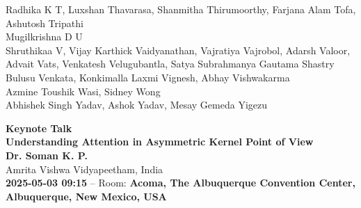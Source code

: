 \documentclass[11pt,oneside]{book}
\begin{document}
\begin{description}
      \newline
          Radhika K T, Luxshan Thavarasa, Shanmitha Thirumoorthy, Farjana Alam Tofa, Ashutosh Tripathi\\
      \newline
          Mugilkrishna D U\\
      \newline
          Shruthikaa V, Vijay Karthick Vaidyanathan, Vajratiya Vajrobol, Adarsh Valoor, Advait Vats, Venkatesh Velugubantla, Satya Subrahmanya Gautama Shastry Bulusu Venkata, Konkimalla Laxmi Vignesh, Abhay Vishwakarma\\
      \newline
          Azmine Toushik Wasi, Sidney Wong\\
      \newline
          Abhishek Singh Yadav, Ashok Yadav, Mesay Gemeda Yigezu\\
      \newline
      
\end{description}
\newpage

  \begin{center}
          {\Large \textbf{Keynote Talk}\\}
      {\LARGE \textbf{Understanding Attention in Asymmetric Kernel Point of View}\\}
        \vspace*{0.5cm}
    \textbf{Dr. Soman K. P.}\\
        Amrita Vishwa Vidyapeetham, India\\
        
        
        \textbf{2025-05-03 09:15} -- 
                Room: \textbf{Acoma, The Albuquerque Convention Center, Albuquerque, New Mexico, USA}\\
        
  \end{center}
\end{document}

